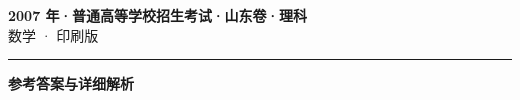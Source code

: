\documentclass[zihao=5, a4paper]{ctexart}
\begin{document}
\begin{center}
  {\Large\bfseries 2007 年·普通高等学校招生考试·山东卷·理科}\\[4pt]
  {\large 数学 · 印刷版}
\end{center}
\medskip
{}

\par\bigskip\hrule\bigskip
{}
\begin{center}{\large\bfseries 参考答案与详细解析}\end{center}
\smallskip

\end{document}
